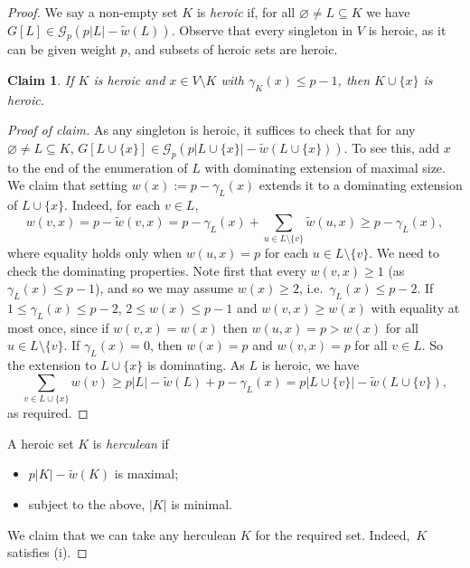 \documentclass[10pt,a4paper]{amsart}
\newcommand{\cG}{\mathcal{G}}
\newtheorem{claim}{Claim}
\newenvironment{poc}{\begin{proof}[Proof of claim]\renewcommand*{\qedsymbol}{$\blacksquare$}}{\end{proof}}
\begin{document}
\begin{proof}
We say a non-empty set $K$ is \emph{heroic} if, for all $\varnothing \neq L \subseteq K$ we have $G[L] \in \mathcal{G}_p(p|L|-\tilde{w}(L))$. Observe that every singleton in $V$ is heroic, as it can be given weight $p$, and subsets of heroic sets are heroic.

\begin{claim}\label{cl-hero}
If $K$ is heroic and $x \in V\setminus K$ with $\gamma_K(x) \leq p-1$, then $K \cup \{x\}$ is heroic.
\end{claim}
\begin{poc}
	As any singleton is heroic, it suffices to check that for any $\varnothing\neq L\subseteq K$, $G[L\cup \{x\}]\in\cG_p(p|L \cup \lbrace x\rbrace| - \tilde{w}(L \cup \lbrace x\rbrace))$. To see this, add $x$ to the end of the enumeration of $L$ with dominating extension of maximal size. We claim that setting $w(x):=p-\gamma_L(x)$ extends it to a dominating extension of $L\cup \{x\}$. Indeed, for each $v\in L$, \begin{equation*}%
		w(v,x)=p- \tilde{w}(v,x)= p-\gamma_L(x)+\sum_{u\in L\setminus \{v\}}\tilde{w}(u,x)\geq p-\gamma_L(x),
	\end{equation*}
	where equality holds only when $w(u,x)=p$ for each $u\in L\setminus \{v\}$.
	We need to check the dominating properties.
	Note first that every $w(v,x) \geq 1$ (as $\gamma_L(x) \leq p-1$), and so we may assume $w(x)\ge 2$, i.e.~$\gamma_L(x)\le p-2$. 
	If $1 \leq \gamma_L(x) \leq p-2$, $2 \leq w(x) \leq p-1$ and $w(v,x) \geq w(x)$ with equality at most once, since if $w(v,x)=w(x)$ then $w(u,x)=p>w(x)$ for all $u \in L\setminus\{v\}$.
	If $\gamma_L(x)=0$, then $w(x)=p$ and $w(v,x)=p$ for all $v \in L$.
	So the extension to $L \cup \{x\}$ is dominating.
	As $L$ is heroic, we have
	$$
	\sum_{v \in L\cup\lbrace x\rbrace}w(v) \geq p|L|-\tilde{w}(L)+p-\gamma_L(x) = p|L \cup \lbrace v\rbrace| - \tilde{w}(L \cup \lbrace v\rbrace),
	$$
	as required.
\end{poc}

A heroic set $K$ is \emph{herculean} if
\begin{itemize}
	\item $p|K|-\tilde{w}(K)$ is maximal; 
	\item subject to the above, $|K|$ is minimal.
\end{itemize}
We claim that we can take any herculean $K$ for the required set.
Indeed,~$K$ satisfies (i).
	

\end{proof}
\end{document}
